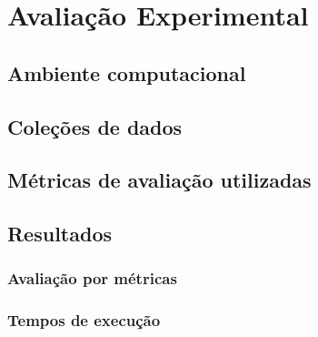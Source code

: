 \chapter{Avaliação Experimental}
\section{Ambiente computacional}



\section{Coleções de dados}



\section{Métricas de avaliação utilizadas}

\section{Resultados}

\subsection{Avaliação por métricas}

\subsection{Tempos de execução}

